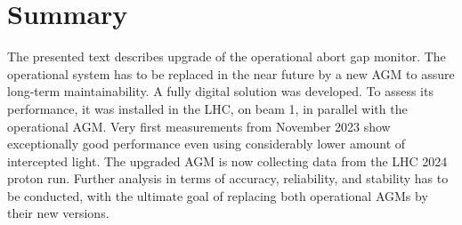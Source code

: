 \section{Summary}
The presented text describes upgrade of the operational abort gap monitor. 
%
The operational system has to be replaced in the near future by a new AGM to assure long-term maintainability.
%
A fully digital solution was developed.
%
To assess its performance, it was installed in the LHC, on beam 1, in parallel with the operational AGM.
%
Very first measurements from November 2023 show exceptionally good performance even using considerably lower amount of intercepted light.
%
The upgraded AGM is now collecting data from the LHC 2024 proton run.
%
Further analysis in terms of accuracy, reliability, and stability has to be conducted, with the ultimate goal of replacing both operational AGMs by their new versions.





